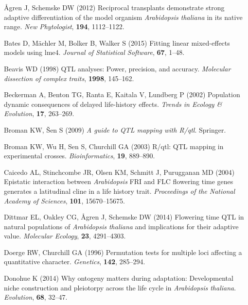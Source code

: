 \documentclass[]{article}
\begin{document}
\leavevmode\hypertarget{ref-agren_reciprocal_2012}{}%
Ågren J, Schemske DW (2012) Reciprocal transplants demonstrate strong adaptive differentiation of the model organism \emph{Arabidopsis thaliana} in its native range. \emph{New Phytologist}, \textbf{194}, 1112--1122.

\leavevmode\hypertarget{ref-bates2015}{}%
Bates D, Mächler M, Bolker B, Walker S (2015) Fitting linear mixed-effects models using lme4. \emph{Journal of Statistical Software}, \textbf{67}, 1--48.

\leavevmode\hypertarget{ref-beavis1998qtl}{}%
Beavis WD (1998) QTL analyses: Power, precision, and accuracy. \emph{Molecular dissection of complex traits}, \textbf{1998}, 145--162.

\leavevmode\hypertarget{ref-beckerman2002population}{}%
Beckerman A, Benton TG, Ranta E, Kaitala V, Lundberg P (2002) Population dynamic consequences of delayed life-history effects. \emph{Trends in Ecology \& Evolution}, \textbf{17}, 263--269.

\leavevmode\hypertarget{ref-Broman2009}{}%
Broman KW, Šen S (2009) \emph{A guide to QTL mapping with R/qtl}. Springer.

\leavevmode\hypertarget{ref-Broman2003}{}%
Broman KW, Wu H, Sen S, Churchill GA (2003) R/qtl: QTL mapping in experimental crosses. \emph{Bioinformatics}, \textbf{19}, 889--890.

\leavevmode\hypertarget{ref-caicedo2004epistatic}{}%
Caicedo AL, Stinchcombe JR, Olsen KM, Schmitt J, Purugganan MD (2004) Epistatic interaction between \emph{Arabidopsis} FRI and FLC flowering time genes generates a latitudinal cline in a life history trait. \emph{Proceedings of the National Academy of Sciences}, \textbf{101}, 15670--15675.

\leavevmode\hypertarget{ref-dittmar2014flowering}{}%
Dittmar EL, Oakley CG, Ågren J, Schemske DW (2014) Flowering time QTL in natural populations of \emph{Arabidopsis thaliana} and implications for their adaptive value. \emph{Molecular Ecology}, \textbf{23}, 4291--4303.

\leavevmode\hypertarget{ref-doerge1996permutation}{}%
Doerge RW, Churchill GA (1996) Permutation tests for multiple loci affecting a quantitative character. \emph{Genetics}, \textbf{142}, 285--294.

\leavevmode\hypertarget{ref-donohue2014ontogeny}{}%
Donohue K (2014) Why ontogeny matters during adaptation: Developmental niche construction and pleiotorpy across the life cycle in \emph{Arabidopsis thaliana}. \emph{Evolution}, \textbf{68}, 32--47.
\end{document}
